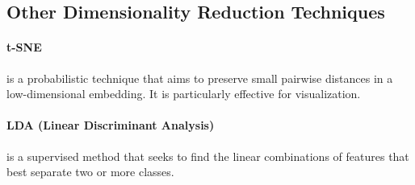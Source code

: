 \subsection{Other Dimensionality Reduction Techniques}

\paragraph{t-SNE} is a probabilistic technique that aims to preserve small pairwise distances in a low-dimensional embedding. It is particularly effective for visualization.

\paragraph{LDA (Linear Discriminant Analysis)} is a supervised method that seeks to find the linear combinations of features that best separate two or more classes.
